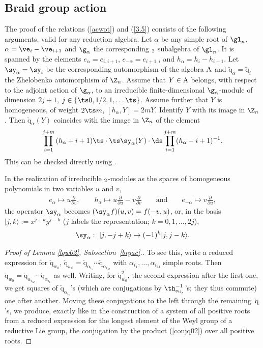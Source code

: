 \documentclass[11pt]{article}
\def\a{\alpha}\def\Ar{{\rm A}}\def\Ab{\bar{\rm A}}\def\b{\beta}\def\bb{\mathfrak{b}}
\def\q{\check{\mathrm q}}\def\Q{\mathrm{Q}}\def\r#1{(\ref{#1})}\let\rf=\r
\numberwithin{equation}{section}
\begin{document}
\subsection{Braid group action}

The proof of the relations \rf{acwot} and \rf{3.5} consists of the following arguments, valid for any
reduction algebra. Let $\a$ be any simple root of $\gl_n$, $\a=\ve_i-\ve_{i+1}$ and $\g_\a$ the
corresponding $\sl_2$ subalgebra of $\gl_n$. It is spanned by the elements $e_\a=e_{i,i+1}$,
$e_{-\a}= e_{i+1,i}$ and $h_\a= h_i-h_{i+1}$. Let $\sy_\a=\sy_i$ be the corresponding
automorphism of the algebra $\Ar$ and $\q_\a=\q_i$ the Zhelobenko automorphism of
$\Z_n$. Assume that $Y\in\Ar$ belongs, with respect to the adjoint action of $\g_\a$, to an irreducible
f\/inite-dimensional $\g_\a$-module of dimension $2j+1$, $j\in\{\ts0,1/2,1,\ldots\ts\}$. Assume further
that $Y$ is homogeneous, of weight $2\ts m$, $[h_\a,Y]=2m Y$. Identify $Y$ with its image in $\Z_n$. Then
$\q_\a(Y)$ coincides with the image in $\Z_n$ of the element
\begin{gather*}%
\prod_{i=1}^{j+m}\,(h_\a+i+1)\ts\cdot\ts\sy_\alpha(Y)\cdot
{\ds\prod_{i=1}^{j+m} (h_\a-i+1)^{-1}}  .
\end{gather*}
This can be checked directly using \cite[Proposition 6.5]{KO}.


In the realization of irreducible $\sl_2$-modules as the spaces of homogeneous polynomials in two
variables $u$ and $v$,
\begin{gather*}e_\a\mapsto u\frac{\partial}{\partial v}  , \qquad h_\a\mapsto u\frac{\partial}{\partial u}-v\frac{\partial}{\partial v}
\qquad {\mathrm{and}}\qquad  e_{-\a}\mapsto v\frac{\partial}{\partial u}  ,
\end{gather*}
the operator $\sy_\alpha$ becomes $(\sy_\alpha f)(u,v)=f(-v,u)$, or, in the basis $|j,k\rangle :=x^{j+k}y^{j-k}$ ($j$ labels the
representation; $k=0,1,\dots ,2j$),
\begin{gather*}\sy_\alpha : \  |j,-j+k\rangle\mapsto (-1)^k |j,j-k\rangle  .\end{gather*}

\begin{proof}[Proof  of Lemma \ref{lqw02}, Subsection~\ref{brgac}.] %
To see this, write a reduced expression for $\q_{w_0}$, $\q_{w_0}=\q_{\alpha_{i_1}}\cdots \q_{\alpha_{i_M}}$
with $\alpha_{i_1},\dots ,\alpha_{i_M}$ simple roots. Then $\q_{w_0}=\q_{\alpha_{i_M}}\cdots \q_{\alpha_{i_1}}$ as well.
Writing, for $\q_{w_0}^2$, the second expression after the f\/irst one, we get squares of
$\q_{\alpha_{i_s}}$'s (which are conjugations by $\th_{\alpha_{i_s}}^{-1}$'s; they thus commute) one after another.
Moving these conjugations to the left through the remaining~$\q$'s, we produce, exactly like in the
construction of a system of all positive roots from a reduced expression for
the longest element of the Weyl group of a reductive Lie group, the conjugation by the product (\ref{conjq02})
over all positive roots.
\end{proof}
\end{document}
